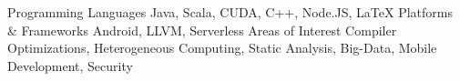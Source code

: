 \begin{cvskills}
    \cvskill
    {Programming Languages}
    {Java, Scala, CUDA, C++, Node.JS, LaTeX}
    \cvskill
    {Platforms \& Frameworks}
    {Android, LLVM, Serverless}
    \cvskill
    {Areas of Interest}
    {Compiler Optimizations, Heterogeneous Computing, Static Analysis, Big-Data, Mobile Development, Security}

\end{cvskills}

